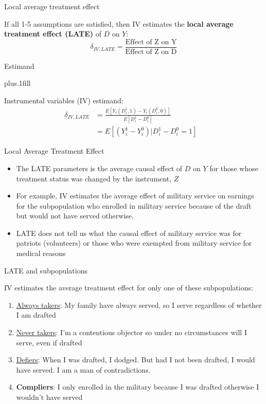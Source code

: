 \documentclass{beamer}
\begin{document}
\begin{frame}{Local average treatment effect}

	If all 1-5 assumptions are satisfied, then IV estimates the \textbf{local average treatment effect (LATE)} of $D$ on $Y$: $$\delta_{IV,LATE} =\frac{\text{Effect of Z on Y}}{\text{Effect of Z on D}}$$

\end{frame}	

\begin{frame}{Estimand}

	\vskip3pt plus.1fill
				
	Instrumental variables (IV) estimand: 
	\begin{align*}
	\delta_{IV,LATE} & = \frac{E[Y_i(D^1_i, 1) - Y_i(D^0_i, 0)]}{E[D^1_i - D^0_i]}& \\
	& = E[(Y^1_i - Y^0_i) | D^1_i - D^0_i = 1]
	\end{align*}

\end{frame}		

\begin{frame}{Local Average Treatment Effect}
	
	\begin{itemize}
	\item The LATE parameters is the average causal effect of $D$ on $Y$ for those whose treatment status was changed by the instrument, $Z$
	\item For example, IV estimates the average effect of military service on earnings for the subpopulation who enrolled in military service because of the draft but would not have served otherwise. 
	\item LATE does not tell us what the causal effect of military service was for patriots (volunteers) or those who were exempted from military service for medical reasons 
	\end{itemize}
	
\end{frame}


\begin{frame}{LATE and subpopulations}
	
IV estimates the average treatment effect for only one of these subpopulations:
		\begin{enumerate}
		\item \underline{Always takers}: My family have always served, so I serve regardless of whether I am drafted
		\item \underline{Never takers}: I'm a contentious objector so under no circumstances will I serve, even if drafted
		\item \underline{Defiers}: When I was drafted, I dodged. But had I not been drafted, I would have served. I am a man of contradictions.
		\item \textbf{Compliers}: I only enrolled in the military because I was drafted otherwise I wouldn't have served
		\end{enumerate}
\end{frame}
\end{document}
